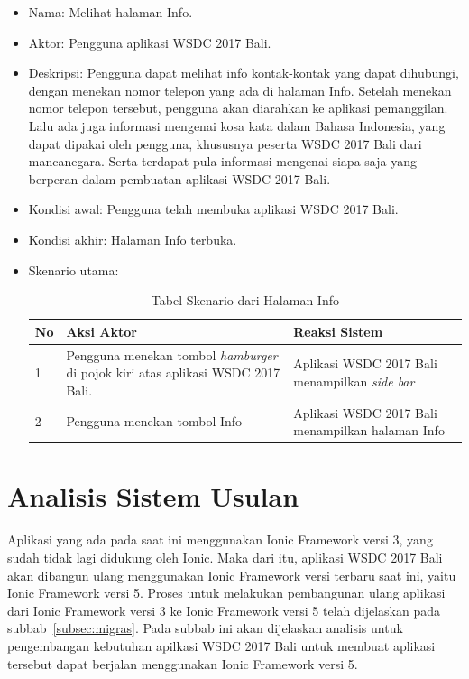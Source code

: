 \begin{enumerate}
	\begin{itemize}
		\item Nama: Melihat halaman Info.
		\item Aktor: Pengguna aplikasi WSDC 2017 Bali.
		\item Deskripsi: Pengguna dapat melihat info kontak-kontak yang dapat dihubungi, dengan menekan nomor telepon yang ada di halaman Info. Setelah menekan nomor telepon tersebut, pengguna akan diarahkan ke aplikasi pemanggilan. Lalu ada juga informasi mengenai kosa kata dalam Bahasa Indonesia, yang dapat dipakai oleh pengguna, khususnya peserta WSDC 2017 Bali dari mancanegara. Serta terdapat pula informasi mengenai siapa saja yang berperan dalam pembuatan aplikasi WSDC 2017 Bali.
		\item Kondisi awal: Pengguna telah membuka aplikasi WSDC 2017 Bali.
		\item Kondisi akhir: Halaman Info terbuka.
		\item Skenario utama: \\
		\begin{table}[H]
			\centering
			\begin{tabular}{|p{0.5cm}|p{7cm}|p{7cm}|}
				\hline
				No & Aksi Aktor                               & Reaksi Sistem                                          \\ \hline
				1  & Pengguna menekan tombol {\it hamburger} di pojok kiri atas aplikasi WSDC 2017 Bali. & Aplikasi WSDC 2017 Bali menampilkan {\it side bar} \\ \hline
				2  & Pengguna menekan tombol Info & Aplikasi WSDC 2017 Bali menampilkan halaman Info \\ \hline
			\end{tabular}
			\caption{Tabel Skenario dari Halaman Info}
			\label{table:skenarioHalamanInfo}
		\end{table}
	\end{itemize}
\end{enumerate}

\section{Analisis Sistem Usulan}
\label{sec:analisisSistemUsulan}

Aplikasi yang ada pada saat ini menggunakan Ionic Framework versi 3, yang sudah tidak lagi didukung oleh Ionic. Maka dari itu, aplikasi WSDC 2017 Bali akan dibangun ulang  menggunakan Ionic Framework versi terbaru saat ini, yaitu Ionic Framework versi 5. Proses untuk melakukan pembangunan ulang aplikasi dari Ionic Framework versi 3 ke Ionic Framework versi 5 telah dijelaskan pada subbab~\ref{subsec:migras}. Pada subbab ini akan dijelaskan analisis untuk pengembangan kebutuhan apilkasi WSDC 2017 Bali untuk membuat aplikasi tersebut dapat berjalan menggunakan Ionic Framework versi 5.

